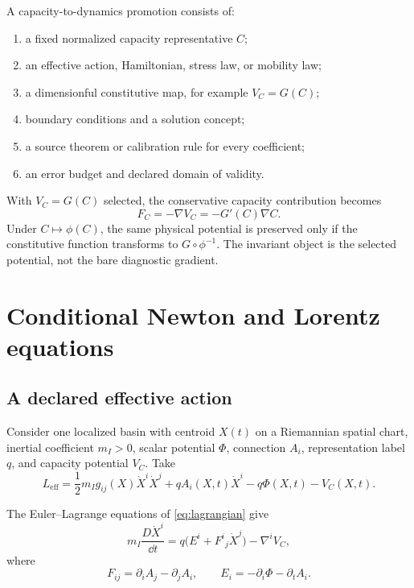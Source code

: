 \documentclass[11pt]{article}
\begin{document}
\begin{definition}\label{def:promotion}
A capacity-to-dynamics promotion consists of:
\begin{enumerate}
\item a fixed normalized capacity representative $C$;
\item an effective action, Hamiltonian, stress law, or mobility law;
\item a dimensionful constitutive map, for example $V_C=G(C)$;
\item boundary conditions and a solution concept;
\item a source theorem or calibration rule for every coefficient;
\item an error budget and declared domain of validity.
\end{enumerate}
\end{definition}

With $V_C=G(C)$ selected, the conservative capacity contribution becomes
\[
 F_C=-\nabla V_C=-G'(C)\nabla C.
\]
Under $C\mapsto\phi(C)$, the same physical potential is preserved only if the
constitutive function transforms to $G\circ\phi^{-1}$.  The invariant object
is the selected potential, not the bare diagnostic gradient.

\section{Conditional Newton and Lorentz equations}

\subsection{A declared effective action}

Consider one localized basin with centroid $X(t)$ on a Riemannian spatial
chart, inertial coefficient $m_I>0$, scalar potential $\Phi$, connection
$A_i$, representation label $q$, and capacity potential $V_C$.  Take
\begin{equation}\label{eq:lagrangian}
 L_{\mathrm{eff}}
 =
 \frac12m_I g_{ij}(X)\dot X^i\dot X^j
 +qA_i(X,t)\dot X^i
 -q\Phi(X,t)-V_C(X,t).
\end{equation}

\begin{theorem}\label{thm:force}
The Euler--Lagrange equations of \cref{eq:lagrangian} give
\[
 m_I\frac{D\dot X^i}{\dd t}
 =
 q\bigl(E^i+F^i{}_j\dot X^j\bigr)
 -\nabla^iV_C,
\]
where
\[
 F_{ij}=\partial_iA_j-\partial_jA_i,
 \qquad
 E_i=-\partial_i\Phi-\partial_tA_i.
\]
\end{theorem}
\end{document}
